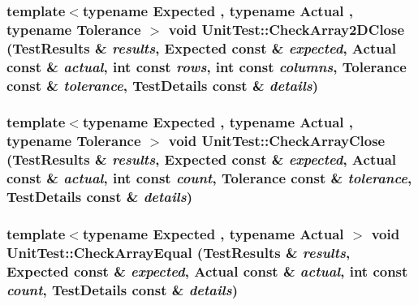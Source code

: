 \hypertarget{namespace_unit_test_1e2cb7cf282dcd896cc2c3810576fd8b}{
\subsubsection[{CheckArray2DClose}]{\setlength{\rightskip}{0pt plus 5cm}template$<$typename Expected , typename Actual , typename Tolerance $>$ void UnitTest::CheckArray2DClose (TestResults \& {\em results}, \/  Expected const \& {\em expected}, \/  Actual const \& {\em actual}, \/  int const  {\em rows}, \/  int const  {\em columns}, \/  Tolerance const \& {\em tolerance}, \/  TestDetails const \& {\em details})}}
\label{namespace_unit_test_1e2cb7cf282dcd896cc2c3810576fd8b}


\hypertarget{namespace_unit_test_695643a3df5c6f3cb60d428dcda22fcb}{
\subsubsection[{CheckArrayClose}]{\setlength{\rightskip}{0pt plus 5cm}template$<$typename Expected , typename Actual , typename Tolerance $>$ void UnitTest::CheckArrayClose (TestResults \& {\em results}, \/  Expected const \& {\em expected}, \/  Actual const \& {\em actual}, \/  int const  {\em count}, \/  Tolerance const \& {\em tolerance}, \/  TestDetails const \& {\em details})}}
\label{namespace_unit_test_695643a3df5c6f3cb60d428dcda22fcb}


\hypertarget{namespace_unit_test_dc09d2b88bb76b95ad22c8ddad4a3b2e}{
\subsubsection[{CheckArrayEqual}]{\setlength{\rightskip}{0pt plus 5cm}template$<$typename Expected , typename Actual $>$ void UnitTest::CheckArrayEqual (TestResults \& {\em results}, \/  Expected const \& {\em expected}, \/  Actual const \& {\em actual}, \/  int const  {\em count}, \/  TestDetails const \& {\em details})}}
\label{namespace_unit_test_dc09d2b88bb76b95ad22c8ddad4a3b2e}


